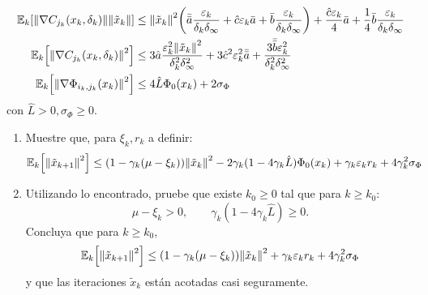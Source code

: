 \documentclass{article}
\begin{document}
\begin{enumerate}
	\begin{align*}
		\mathbb{E}_k \qty[ \norm{\nabla C_{j_k}(x_k, \delta_k)} \norm{\tilde{x}_k}] & \leq \norm{\tilde{x}_k}^2 \qty( \bar{\bar{a}}  \frac{\varepsilon_k}{\delta_k \delta_\infty} + \hat{c} \varepsilon_k \bar{a} + \bar{b} \frac{\varepsilon_k}{\delta_k \delta_\infty}) + \frac{\hat{c} \varepsilon_k}{4} \bar{a} + \frac{1}{4} \bar{b} \frac{\varepsilon_k}{\delta_k \delta_\infty} \\
		\mathbb{E}_k\qty[\norm{\nabla C_{j_k}(x_k, \delta_k)}^2] &\leq 3 \hat{a} \frac{\varepsilon_k^2 \norm{\tilde{x}_k}^2}{\delta_k^2 \delta_\infty^2} + 3 \hat{c}^2 \varepsilon_k^2 \bar{\bar{a}} + \frac{3 \bar{\bar{b}} \varepsilon_k^2}{\delta_k^2 \delta_\infty^2} \\
		\mathbb{E}_k \qty[\norm{\nabla \Phi_{i_k, j_k}(x_k)}^2] & \leq  4\hat{L} \Phi_0(x_k) + 2 \sigma_\Phi
	\end{align*}
	con \(\hat{L} > 0, \sigma_\Phi \geq 0\).
	\begin{enumerate}
		\item Muestre que, para \(\xi_k, r_k\) a definir:
		\[\mathbb{E}_k \qty[\norm{\tilde{x}_{k+1}}^2] \leq \qty(1 - \gamma_k (\mu - \xi_k)) \norm{\tilde{x}_k}^2 - 2 \gamma_k (1 - 4\gamma_k \hat{L}) \Phi_0(x_k) + \gamma_k \varepsilon_k r_k + 4 \gamma_k^2 \sigma_\Phi \]
		\item Utilizando lo encontrado, pruebe que existe \(k_0 \geq 0\) tal que para \(k \geq k_0\):
		\[\mu - \xi_k > 0, \qquad \gamma_k (1 - 4 \gamma_k \hat{L}) \geq 0.\]
		Concluya que para \(k \geq k_0\),
		\[\mathbb{E}_k \qty[\norm{\tilde{x}_{k+1}}^2] \leq \qty(1 - \gamma_k (\mu - \xi_k)) \norm{\tilde{x}_k}^2 + \gamma_k \varepsilon_k r_k + 4 \gamma_k^2 \sigma_\Phi \]
		y que las iteraciones \(\tilde{x}_k\) están acotadas casi seguramente.
	\end{enumerate}
\end{enumerate}
\end{document}
